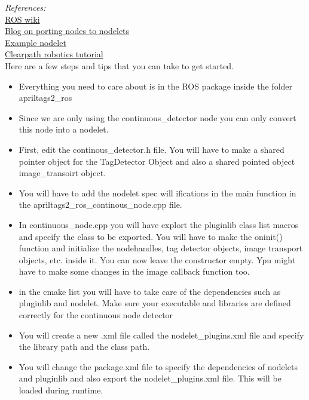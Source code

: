 \documentclass[letta4 paper]{article}
\begin{document}
 \noindent\textit{References: }\\
 \href{http://wiki.ros.org/nodelet}{ROS wiki}\\
 \href{http://tayyabnaseer.blogspot.com/2013/04/porting-nodes-to-nodelets-in-ros.html}{Blog on porting nodes to nodelets}\\
 \href{https://github.com/cryborg21/sample_nodelet/tree/master/src}{Example nodelet}\\
 \href{https://www.clearpathrobotics.com/assets/guides/ros/Nodelet\%20Everything.html}{Clearpath robotics tutorial}\\

Here are a few steps and tips that you can take to get started.
\begin{itemize}
    

\item Everything you need to care about is in the ROS package inside the folder apriltags2\_ros
 
 \item Since we are only using the continuous\_detector node you can only convert this node into a nodelet. \item First, edit the continous\_detector.h file. You will have to make a shared pointer object for the TagDetector Object and also a shared pointed object image\_transoirt object. 
\item  You will have to add the nodelet spec will ifications in the main function in the apriltags2\_ros\_continous\_node.cpp file. 
\item In continuous\_node.cpp you will have explort the pluginlib class list macros and specify the class to be exported. You will have to make the oninit() function and initialize the nodehandles, tag detector objects, image transport objects, etc. inside it. You can now leave the constructor empty. Ypu might have to make some changes in the image callback function too. 
\item in the cmake list you will have to take care of the dependencies such as pluginlib and nodelet. Make sure your executable and libraries are defined correctly for the continuous node detector
\item You will create a new .xml file called the nodelet\_plugins.xml file and specify the library path and the class path. 
\item You will change the package.xml file to specify the dependencies of nodelets and pluginlib and also export the nodelet\_plugins.xml file. This will be loaded during runtime. 
 

\end{itemize}
\end{document}
